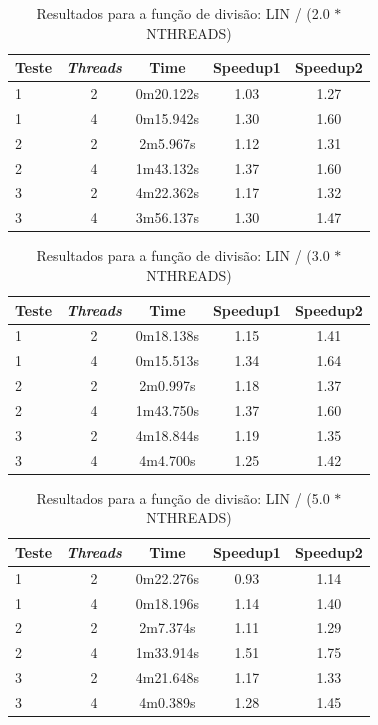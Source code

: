 \documentclass[12pt]{article}
\begin{document}
\begin{table}[H]
    \begin{tabular}{ | l | c | c | c | c |}
      \hline
      \textbf{Teste} & \textbf{\textit{Threads}} & \textbf{Time} & \textbf{Speedup1} & \textbf{Speedup2}\\ \hline
      1 & 2 & 0m20.122s & 1.03 & 1.27 \\ \hline
      1 & 4 & 0m15.942s & 1.30 & 1.60 \\ \hline
      2 & 2 & 2m5.967s & 1.12 & 1.31 \\ \hline
      2 & 4 & 1m43.132s & 1.37 & 1.60 \\ \hline
      3 & 2 & 4m22.362s & 1.17 & 1.32 \\ \hline
      3 & 4 & 3m56.137s & 1.30 & 1.47 \\ \hline
  \end{tabular}
  \caption{Resultados para a função de divisão: LIN / (2.0 $*$ NTHREADS)}
  \label{tbl:resultados2}
\end{table}

\begin{table}[H]
    \begin{tabular}{ | l | c | c | c | c |}
      \hline
      \textbf{Teste} & \textbf{\textit{Threads}} & \textbf{Time} & \textbf{Speedup1} & \textbf{Speedup2}\\ \hline
      1 & 2 & 0m18.138s & 1.15 & 1.41 \\ \hline
      1 & 4 & 0m15.513s & 1.34 & 1.64 \\ \hline
      2 & 2 & 2m0.997s & 1.18 & 1.37 \\ \hline
      2 & 4 & 1m43.750s & 1.37 & 1.60 \\ \hline
      3 & 2 & 4m18.844s & 1.19 & 1.35 \\ \hline
      3 & 4 & 4m4.700s & 1.25 & 1.42 \\ \hline
  \end{tabular}
  \caption{Resultados para a função de divisão: LIN / (3.0 $*$ NTHREADS)}
  \label{tbl:resultados3}
\end{table}

\begin{table}[H]
    \begin{tabular}{ | l | c | c | c | c |}
      \hline
      \textbf{Teste} & \textbf{\textit{Threads}} & \textbf{Time} & \textbf{Speedup1} & \textbf{Speedup2}\\ \hline
      1 & 2 & 0m22.276s & 0.93 & 1.14 \\ \hline
      1 & 4 & 0m18.196s & 1.14 & 1.40 \\ \hline
      2 & 2 & 2m7.374s & 1.11 & 1.29\\ \hline
      2 & 4 & 1m33.914s & 1.51 & 1.75 \\ \hline
      3 & 2 & 4m21.648s & 1.17 & 1.33 \\ \hline
      3 & 4 & 4m0.389s & 1.28 & 1.45 \\ \hline
  \end{tabular}
  \caption{Resultados para a função de divisão: LIN / (5.0 $*$ NTHREADS)}
  \label{tbl:resultados5}
\end{table}
\end{document}
